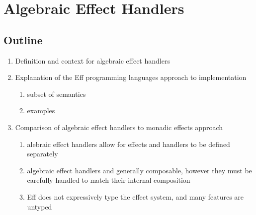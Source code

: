 \chapter{Algebraic Effect Handlers}

\section{Outline}
\begin{enumerate}
  \item Definition and context for algebraic effect handlers
  \item Explanation of the Eff programming languages approach to implementation
  \begin{enumerate}
    \item subset of semantics
    \item examples
  \end{enumerate}
  \item Comparison of algebraic effect handlers to monadic effects approach
  \begin{enumerate}
    \item alebraic effect handlers allow for effects and handlers to be defined separately
    \item algebraic effect handlers and generally composable, however they must be carefully handled to match their internal composition
    \item Eff does not expressively type the effect system, and many features are untyped
  \end{enumerate}
\end{enumerate}
